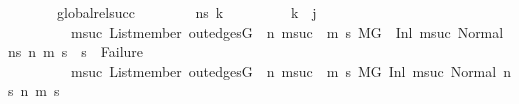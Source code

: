 \begin{isabellebody}
\ \ \ \ \ \ \ global{\isacharunderscore}{\kern0pt}rel{\isacharunderscore}{\kern0pt}succ{\isacharcolon}{\kern0pt}\isanewline
\ \ \ \ \ \ \ {\isachardoublequoteopen}{\isasymAnd}\ ns{}\ k{\isachardot}{\kern0pt}\isanewline
\ \ \ \ \ \ \ \ \ k\ {\isacharless}{\kern0pt}\ j\ {\isasymLongrightarrow}\isanewline
\ \ \ \ \ \ \ \ \ {\isacharparenleft}{\kern0pt}{\isasymforall}msuc{}{\isachardot}{\kern0pt}\ List{\isachardot}{\kern0pt}member\ {\isacharparenleft}{\kern0pt}out{\isacharunderscore}{\kern0pt}edges{\isacharparenleft}{\kern0pt}G{\isacharparenright}{\kern0pt}\ {\isacharbang}{\kern0pt}\ n{\isacharparenright}{\kern0pt}\ msuc{}\ {\isasymlongrightarrow}\ {\isacharparenleft}{\kern0pt}{\isasymforall}m{}\ s{}{\isachardot}{\kern0pt}\ {\isacharparenleft}{\kern0pt}M{\isacharcomma}{\kern0pt}{\isasymLambda}{\isacharcomma}{\kern0pt}{\isasymGamma}{\isacharcomma}{\kern0pt}{\isasymOmega}{\isacharcomma}{\kern0pt}G\ {\isasymturnstile}\ {\isacharparenleft}{\kern0pt}Inl\ msuc{}{\isacharcomma}{\kern0pt}\ Normal\ ns{}{\isacharparenright}{\kern0pt}\ {\isacharminus}{\kern0pt}n{\isasymrightarrow}{\isacharasterisk}{\kern0pt}\ {\isacharparenleft}{\kern0pt}m{}{\isacharcomma}{\kern0pt}\ s{}{\isacharparenright}{\kern0pt}{\isacharparenright}{\kern0pt}\ {\isasymlongrightarrow}\ s{}\ {\isasymnoteq}\ Failure{\isacharparenright}{\kern0pt}{\isacharparenright}{\kern0pt}\ {\isasymLongrightarrow}\isanewline
\ \ \ \ \ \ \ \ \ {\isacharparenleft}{\kern0pt}{\isasymforall}msuc{}{\isachardot}{\kern0pt}\ List{\isachardot}{\kern0pt}member\ {\isacharparenleft}{\kern0pt}out{\isacharunderscore}{\kern0pt}edges{\isacharparenleft}{\kern0pt}G{\isacharparenright}{\kern0pt}\ {\isacharbang}{\kern0pt}\ n{\isacharparenright}{\kern0pt}\ msuc{}\ {\isasymlongrightarrow}\ {\isacharparenleft}{\kern0pt}{\isasymforall}m{\isacharprime}{\kern0pt}\ s{\isacharprime}{\kern0pt}{\isachardot}{\kern0pt}\ {\isacharparenleft}{\kern0pt}M{\isacharcomma}{\kern0pt}{\isasymLambda}{\isacharcomma}{\kern0pt}{\isasymGamma}{\isacharcomma}{\kern0pt}{\isasymOmega}{\isacharcomma}{\kern0pt}G\ {\isasymturnstile}{\isacharparenleft}{\kern0pt}Inl\ msuc{}{\isacharcomma}{\kern0pt}\ Normal\ ns{}{\isacharparenright}{\kern0pt}\ {\isacharminus}{\kern0pt}n{\isasymrightarrow}{\isacharasterisk}{\kern0pt}\ {\isacharparenleft}{\kern0pt}m{\isacharprime}{\kern0pt}{\isacharcomma}{\kern0pt}\ s{\isacharprime}{\kern0pt}{\isacharparenright}{\kern0pt}{\isacharparenright}{\kern0pt}\ {\isasymlongrightarrow}\isanewline

\end{isabellebody}
